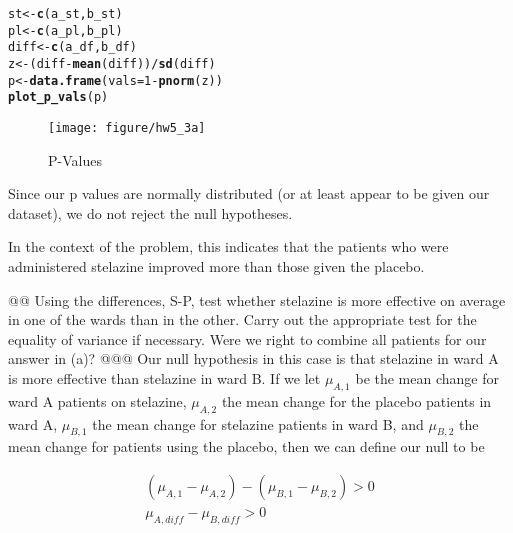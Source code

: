 \documentclass[10pt]{article}\usepackage[]{graphicx}\usepackage[]{xcolor}
\makeatletter
\def\maxwidth{ %
  \ifdim\Gin@nat@width>\linewidth
    \linewidth
  \else
    \Gin@nat@width
  \fi
}
\newcommand{\hlnum}[1]{\textcolor[rgb]{0.686,0.059,0.569}{#1} }%
\newcommand{\hlopt}[1]{\textcolor[rgb]{0,0,0}{#1} }%
\newcommand{\hlstd}[1]{\textcolor[rgb]{0.345,0.345,0.345}{#1} }%
\newcommand{\hlkwb}[1]{\textcolor[rgb]{0.69,0.353,0.396}{#1} }%
\newcommand{\hlkwc}[1]{\textcolor[rgb]{0.333,0.667,0.333}{#1} }%
\newcommand{\hlkwd}[1]{\textcolor[rgb]{0.737,0.353,0.396}{\textbf{#1} } }%
\newenvironment{kframe}{%
 \def\at@end@of@kframe{}%
 \ifinner\ifhmode%
  \def\at@end@of@kframe{\end{minipage} }%
  \begin{minipage}{\columnwidth}%
 \fi\fi%
 \def\FrameCommand##1{\hskip\@totalleftmargin \hskip-\fboxsep
 \colorbox{shadecolor}{##1}\hskip-\fboxsep
     \hskip-\linewidth \hskip-\@totalleftmargin \hskip\columnwidth}%
 \MakeFramed {\advance\hsize-\width
   \@totalleftmargin\z@ \linewidth\hsize
   \@setminipage} }%
 {\par\unskip\endMakeFramed%
 \at@end@of@kframe}
\newenvironment{knitrout}{}{} %
\makeatother
\begin{document}
\begin{easylist}[enumerate]
\begin{knitrout}
\color{fgcolor}\begin{kframe}
\begin{alltt}
             \hlstd{st} \hlkwb{<-} \hlkwd{c}\hlstd{(a_st, b_st)}
             \hlstd{pl} \hlkwb{<-} \hlkwd{c}\hlstd{(a_pl, b_pl)}
             \hlstd{diff} \hlkwb{<-} \hlkwd{c}\hlstd{(a_df, b_df)}
             \hlstd{z} \hlkwb{<-} \hlstd{(diff} \hlopt{-} \hlkwd{mean}\hlstd{(diff))} \hlopt{/} \hlkwd{sd}\hlstd{(diff)}
             \hlstd{p} \hlkwb{<-} \hlkwd{data.frame}\hlstd{(}\hlkwc{vals}\hlstd{=}\hlnum{1} \hlopt{-} \hlkwd{pnorm}\hlstd{(z))}
             \hlkwd{plot_p_vals}\hlstd{(p)}
\end{alltt}
\end{kframe}\begin{figure}[H]


{\centering \texttt{[image: figure/hw5\_3a]} 

}

\caption[P-Values]{P-Values\label{fig:hw5.3a} }
\end{figure}


\end{knitrout}


    Since our p values are normally distributed (or at least appear to be given our dataset), we do not reject the null
    hypotheses.\newline

    In the context of the problem, this indicates that the patients who were administered stelazine improved more than
    those given the placebo.

    @@ Using the differences, S-P, test whether stelazine is more effective on average in one of the wards than in the
    other. Carry out the appropriate test for the equality of variance if necessary. Were we right to combine all
    patients for our answer in (a)?
    @@@ Our null hypothesis in this case is that stelazine in ward A is more effective than stelazine in ward B. If we
    let $\mu_{A,1}$ be the mean change for ward A patients on stelazine, $\mu_{A,2}$ the mean change for the placebo
    patients in ward A, $\mu_{B,1}$ the mean change for stelazine patients in ward B, and $\mu_{B,2}$ the mean change
    for patients using the placebo, then we can define our null to be

    \[
        \begin{aligned}
            ( \mu_{A,1} - \mu_{A,2} ) - ( \mu_{B,1} - \mu_{B,2} ) > 0\\
            \mu_{A,diff} - \mu_{B,diff} > 0
        \end{aligned}
    \]


\end{easylist}
\end{document}
